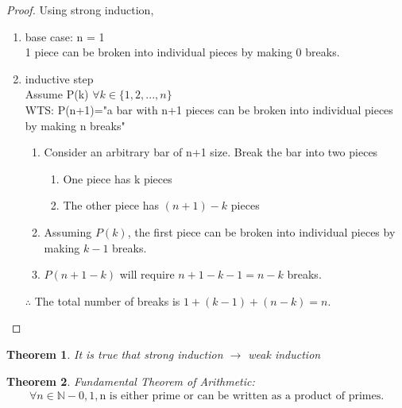 \documentclass{article}
\newcommand{\AllNaturals}{\mathbb{N}}
\newtheorem{theorem}{Theorem}
\begin{document}
\begin{proof}
    Using strong induction,
    \begin{enumerate}
        \item base case: n = 1\\
        1 piece can be broken into individual pieces by making 0 breaks.
        \item inductive step\\
        Assume P(k) \(\forall k \in \{1,2,...,n\}\)\\
        WTS: P(n+1)="a bar with n+1 pieces can be broken into individual pieces by making n breaks"\\
        \begin{enumerate}
            \item Consider an arbitrary bar of n+1 size. Break the bar into two pieces
            \begin{enumerate}
                \item One piece has k pieces
                \item The other piece has \((n+1)-k\) pieces
            \end{enumerate}
            \item Assuming \(P(k)\), the first piece can be broken into individual pieces by making \(k-1\) breaks.
            \item \(P(n+1-k)\) will require \(n+1-k-1=n-k\) breaks.
        \end{enumerate}
        \(\therefore\) The total number of breaks is \(1+(k-1)+(n-k)=n\).
    \end{enumerate}
\end{proof}
\pagebreak
\begin{theorem}
    It is true that strong induction \(\rightarrow\) weak induction
\end{theorem}
\begin{theorem}
    Fundamental Theorem of Arithmetic:
    \begin{align*}
        \forall n \in \AllNaturals - {0,1}, \text{n is either prime or can be written as a product of primes.}\\
    \end{align*}
\end{theorem}
\end{document}
